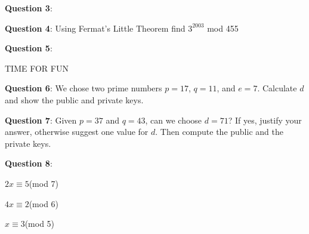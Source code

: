 \documentclass{article} %
\newcommand{\question}[2][]{\begin{flushleft}
        \textbf{Question #1}: #2

\end{flushleft}}
\begin{document}
    \question[3]{}

    \question[4]{Using Fermat's Little Theorem find $3^{2003}$ mod 455}

    \question[5]{}

    TIME FOR FUN

    \question[6]{We chose two prime numbers $p = 17$, $q = 11$, and $e = 7$. Calculate $d$ and show the 
    public and private keys.}

    \question[7]{Given $p = 37$ and $q = 43$, can we choose $d = 71$? If yes, justify your answer, 
    otherwise suggest one value for $d$. Then compute the public and the private keys.}

    \question[8]{}

    $2x \equiv 5$(mod 7)

    $4x \equiv 2$(mod 6)

    $x \equiv 3$(mod 5)
    
\end{document}
